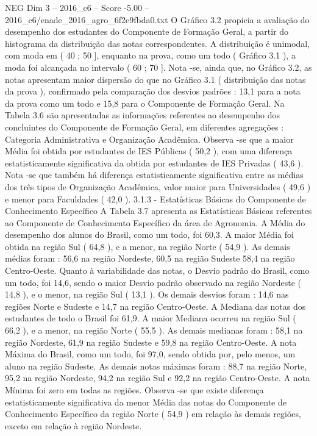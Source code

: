 \begin{textsample}{NEG Dim 3 – 2016\_c6 – Score -5.00 – 2016\_c6/enade\_2016\_agro\_6f2e9fbda0.txt}
O Gráfico 3.2 propicia a avaliação do desempenho dos estudantes do Componente de Formação Geral, a partir do histograma da distribuição das notas correspondentes.
A distribuição é unimodal, com moda em ( 40 ; 50 ], enquanto na prova, como um todo ( Gráfico 3.1 ), a moda foi alcançada no intervalo ( 60 ; 70 ].
Nota -se, ainda que, no Gráfico 3.2, as notas apresentam maior dispersão do que no Gráfico 3.1 ( distribuição das notas da prova ), confirmado pela comparação dos desvios padrões : 13,1 para a nota da prova como um todo e 15,8 para o Componente de Formação Geral.
Na Tabela 3.6 são apresentadas as informações referentes ao desempenho dos concluintes do Componente de Formação Geral, em diferentes agregações : Categoria Administrativa e Organização Acadêmica.
Observa -se que a maior Média foi obtida por estudantes de IES Públicas ( 50,2 ), com uma diferença estatisticamente significativa da obtida por estudantes de IES Privadas ( 43,6 ).
Nota -se que também há diferença estatisticamente significativa entre as médias dos três tipos de Organização Acadêmica, valor maior para Universidades ( 49,6 ) e menor para Faculdades ( 42,0 ). 3.1.3 - Estatísticas Básicas do Componente de Conhecimento Específico A Tabela 3.7 apresenta as Estatísticas Básicas referentes ao Componente de Conhecimento Específico da área de Agronomia.
A Média do desempenho dos alunos do Brasil, como um todo, foi 60,3.
A maior Média foi obtida na região Sul ( 64,8 ), e a menor, na região Norte ( 54,9 ).
As demais médias foram : 56,6 na região Nordeste, 60,5 na região Sudeste 58,4 na região Centro-Oeste.
Quanto à variabilidade das notas, o Desvio padrão do Brasil, como um todo, foi 14,6, sendo o maior Desvio padrão observado na região Nordeste ( 14,8 ), e o menor, na região Sul ( 13,1 ).
Os demais desvios foram : 14,6 nas regiões Norte e Sudeste e 14,7 na região Centro-Oeste.
A Mediana das notas dos estudantes de todo o Brasil foi 61,9.
A maior Mediana ocorreu na região Sul ( 66,2 ), e a menor, na região Norte ( 55,5 ).
As demais medianas foram : 58,1 na região Nordeste, 61,9 na região Sudeste e 59,8 na região Centro-Oeste.
A nota Máxima do Brasil, como um todo, foi 97,0, sendo obtida por, pelo menos, um aluno na região Sudeste.
As demais notas máximas foram : 88,7 na região Norte, 95,2 na região Nordeste, 94,2 na região Sul e 92,2 na região Centro-Oeste.
A nota Mínima foi zero em todas as regiões.
Observa -se que existe diferença estatisticamente significativa da menor Média das notas do Componente de Conhecimento Específico da região Norte ( 54,9 ) em relação às demais regiões, exceto em relação à região Nordeste.

\end{textsample}
